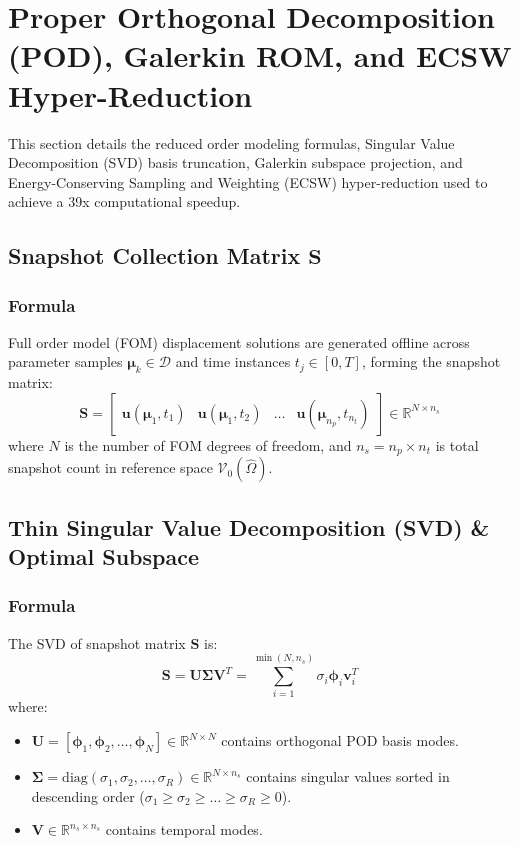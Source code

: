 \section{Proper Orthogonal Decomposition (POD), Galerkin ROM, and ECSW Hyper-Reduction}
\label{sec:pod_rom}

This section details the reduced order modeling formulas, Singular Value Decomposition (SVD) basis truncation, Galerkin subspace projection, and Energy-Conserving Sampling and Weighting (ECSW) hyper-reduction used to achieve a 39x computational speedup.

\subsection{Snapshot Collection Matrix $\mathbf{S}$}

\subsubsection{Formula}
Full order model (FOM) displacement solutions are generated offline across parameter samples $\boldsymbol{\mu}_k \in \mathcal{D}$ and time instances $t_j \in [0, T]$, forming the snapshot matrix:
\begin{equation}
\mathbf{S} = \begin{bmatrix} \mathbf{u}(\boldsymbol{\mu}_1, t_1) & \mathbf{u}(\boldsymbol{\mu}_1, t_2) & \dots & \mathbf{u}(\boldsymbol{\mu}_{n_p}, t_{n_t}) \end{bmatrix} \in \mathbb{R}^{N \times n_s}
\end{equation}
where $N$ is the number of FOM degrees of freedom, and $n_s = n_p \times n_t$ is total snapshot count in reference space $\mathcal{V}_0(\hat{\Omega})$.

\hr

\subsection{Thin Singular Value Decomposition (SVD) \& Optimal Subspace}

\subsubsection{Formula}
The SVD of snapshot matrix $\mathbf{S}$ is:
\begin{equation}
\mathbf{S} = \mathbf{U} \boldsymbol{\Sigma} \mathbf{V}^T = \sum_{i=1}^{\min(N, n_s)} \sigma_i \mathbf{\phi}_i \mathbf{v}_i^T
\end{equation}
where:
\begin{itemize}
    \item $\mathbf{U} = [\mathbf{\phi}_1, \mathbf{\phi}_2, \dots, \mathbf{\phi}_N] \in \mathbb{R}^{N \times N}$ contains orthogonal POD basis modes.
    \item $\boldsymbol{\Sigma} = \text{diag}(\sigma_1, \sigma_2, \dots, \sigma_R) \in \mathbb{R}^{N \times n_s}$ contains singular values sorted in descending order ($\sigma_1 \ge \sigma_2 \ge \dots \ge \sigma_R \ge 0$).
    \item $\mathbf{V} \in \mathbb{R}^{n_s \times n_s}$ contains temporal modes.
\end{itemize}

